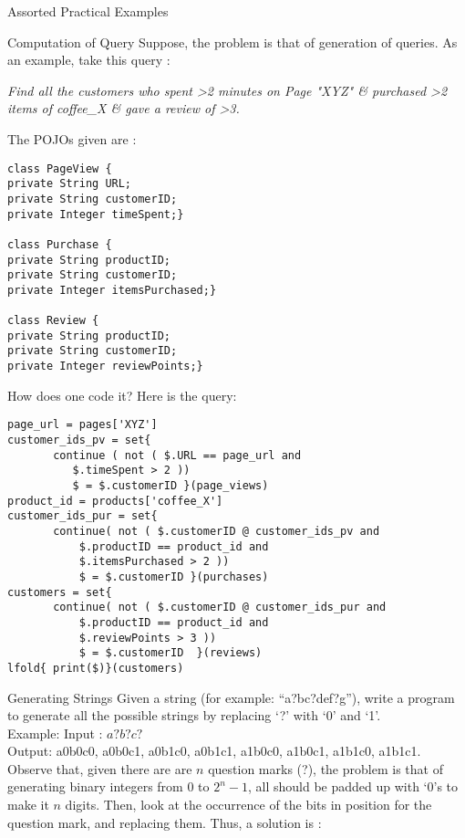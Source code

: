\begin{section}{Assorted Practical Examples}
\begin{subsection}{Computation of Query}
Suppose, the problem is that of generation of queries.
As an example, take this query :

\emph{
Find all the customers who spent >2 minutes on Page "XYZ" 
\& purchased  >2 items of coffee\_X \& gave a review of >3. 
}

The POJOs given are :

\begin{center}\begin{minipage}{\linewidth}
\begin{lstlisting}[style=myJavaStyle]
class PageView { 
private String URL; 
private String customerID; 
private Integer timeSpent;} 

class Purchase { 
private String productID; 
private String customerID; 
private Integer itemsPurchased;} 

class Review { 
private String productID; 
private String customerID; 
private Integer reviewPoints;}
\end{lstlisting}  
\end{minipage}\end{center}

How does one code it? Here is the query:

\begin{center}\begin{minipage}{\linewidth}
\begin{lstlisting}[style=JexlStyle]
page_url = pages['XYZ']
customer_ids_pv = set{ 
       continue ( not ( $.URL == page_url and 
          $.timeSpent > 2 ))
          $ = $.customerID }(page_views)
product_id = products['coffee_X']
customer_ids_pur = set{ 
       continue( not ( $.customerID @ customer_ids_pv and  
           $.productID == product_id and 
           $.itemsPurchased > 2 )) 
           $ = $.customerID }(purchases)
customers = set{ 
       continue( not ( $.customerID @ customer_ids_pur and   
           $.productID == product_id and 
           $.reviewPoints > 3 )) 
           $ = $.customerID  }(reviews)
lfold{ print($)}(customers)
\end{lstlisting}  
\end{minipage}\end{center}
\end{subsection}

\begin{subsection}{Generating Strings}
Given a string (for example: ``a?bc?def?g''), write a program 
to generate all the possible strings by replacing `?' with `0' and `1'. \\
Example: Input : $a?b?c?$ \\  
Output: a0b0c0, a0b0c1, a0b1c0, a0b1c1, a1b0c0, a1b0c1, a1b1c0, a1b1c1.\\
Observe that, given there are are $n$ question marks (?),
the problem is that of generating binary integers from 0 to $2^n - 1$,
all should be padded up with `0's to make it $n$ digits. Then, 
look at the occurrence of the bits in position for the question mark, 
and replacing them. Thus, a solution is :


\end{subsection}
\end{section}

